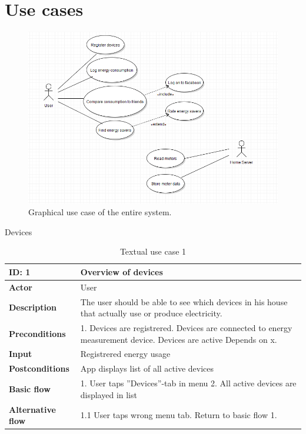 \chapter{Use cases}
\begin{figure}[H]
\includegraphics[width=\textwidth]{ch/specification/fig/usecase.png}
\caption{Graphical use case of the entire system.}
\label{fig:usecase}
\end{figure}

Devices

\begin{table}[H]
\begin{tabular}{|l|p{11.7cm}|}
\hline
\textbf{ID:} 1&\textbf{Overview of devices}\\\hline
\textbf{Actor} &User\\\hline
\textbf{Description}&
The user should be able to see which devices in his house that actually use or produce electricity.\\\hline
\textbf{Preconditions}&
1. Devices are registrered\newline
2. Devices are connected to energy measurement device\newline
3. Devices are active\newline
Depends on x.\\\hline
\textbf{Input}&
Registrered energy usage\\\hline
\textbf{Postconditions}& App displays list of all active devices\\\hline
\textbf{Basic flow}&
1. User taps ''Devices''-tab in menu
2. All active devices are displayed in list\\\hline
\textbf{Alternative flow}&
1.1 User taps wrong menu tab. Return to basic flow 1.\\\hline
\end{tabular}
\caption{Textual use case 1}
\end{table}



